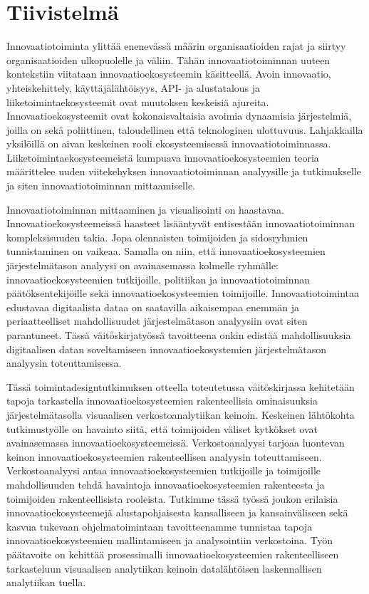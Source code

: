 \chapter{Tiivistelmä}

Innovaatiotoiminta ylittää enenevässä määrin organisaatioiden rajat ja siirtyy organisaatioiden ulkopuolelle ja väliin. Tähän innovaatiotoiminnan uuteen kontekstiin viitataan innovaatioekosysteemin käsitteellä. Avoin innovaatio, yhteiskehittely, käyttäjälähtöisyys, API- ja alustatalous ja liiketoimintaekosysteemit ovat muutoksen keskeisiä ajureita. Innovaatioekosysteemit ovat kokonaisvaltaisia avoimia dynaamisia järjestelmiä, joilla on sekä poliittinen, taloudellinen että teknologinen ulottuvuus. Lahjakkailla yksilöillä on aivan keskeinen rooli ekosysteemisessä innovaatiotoiminnassa. Liiketoimintaekosysteemeistä kumpuava innovaatioekosysteemien teoria määrittelee uuden viitekehyksen innovaatiotoiminnan analyysille ja tutkimukselle ja siten innovaatiotoiminnan mittaamiselle. 

Innovaatiotoiminnan mittaaminen ja visualisointi on haastavaa. Innovaatioekosysteemeissä haasteet lisääntyvät entisestään innovaatiotoiminnan kompleksisuuden takia. Jopa olennaisten toimijoiden ja sidosryhmien tunnistaminen on vaikeaa. Samalla on niin, että innovaatioekosysteemien järjestelmätason analyysi on avainasemassa kolmelle ryhmälle: innovaatioekosysteemien tutkijoille, politiikan ja innovaatiotoiminnan päätöksentekijöille sekä innovaatioekosysteemien toimijoille. Innovaatiotoimintaa edustavaa digitaalista dataa on saatavilla aikaisempaa enemmän ja periaatteelliset mahdollisuudet järjestelmätason analyysiin ovat siten parantuneet. Tässä väitöskirjatyössä tavoitteena onkin edistää mahdollisuuksia digitaalisen datan soveltamiseen innovaatioekosystemien järjestelmätason analyysin toteuttamisessa. 

Tässä toimintadesigntutkimuksen otteella toteutetussa väitöskirjassa kehitetään tapoja tarkastella innovaatioekosysteemien rakenteellisia ominaisuuksia järjestelmätasolla visuaalisen verkostoanalytiikan keinoin. Keskeinen lähtökohta tutkimustyölle on havainto siitä, että  toimijoiden väliset kytkökset ovat avainasemassa innovaatioekosysteemeissä. Verkostoanalyysi tarjoaa luontevan keinon innovaatioekosysteemien rakenteellisen analyysin toteuttamiseen. Verkostoanalyysi antaa innovaatioekosysteemien tutkijoille ja toimijoille mahdollisuuden tehdä havaintoja innovaatioekosysteemien rakenteesta ja toimijoiden rakenteellisista rooleista. Tutkimme tässä työssä joukon erilaisia innovaatioekosysteemejä alustapohjaisesta kansalliseen ja kansainväliseen sekä kasvua tukevaan ohjelmatoimintaan tavoitteenamme tunnistaa tapoja innovaatioekosysteemien mallintamiseen ja analysointiin verkostoina. Työn päätavoite on kehittää prosessimalli innovaatioekosysteemien rakenteelliseen tarkasteluun visuaalisen analytiikan keinoin  datalähtöisen laskennallisen analytiikan tuella. 

